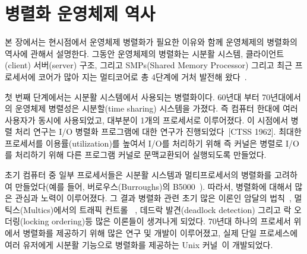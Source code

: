\section{병렬화 운영체제 역사}




본 장에서는 현시점에서 운영체제 병렬화가 필요한 이유와 함께 운영체제의 병렬화의 역사에 관해서 설명한다.
그동안 운영체제의 병렬화는 시분활 시스템, 클라이언트(client) 서버(server) 구조, 그리고 SMPs(Shared Memory
Processor) 그리고 최근 프로세서에 코어가 많아 지는 멀티코어로 총 4단계에 거처 발전해 왔다~\cite{Kaashoek2015PCO}.

첫 번째 단계에서는 시분활 시스템에서 사용되는 병렬화이다. 
60년대 부터 70년대에서의 운영체제 병렬성은 시분할(time sharing) 시스템을 가졌다.
즉 컴퓨터 한대에 여러 사용자가 동시에 사용되었고, 대부분이 1개의 프로세서로 이루어졌다.
이 시점에서 병렬 처리 연구는 I/O 병렬화 프로그램에 대한 연구가 진행되었다~\cite{Bloch1959EDS}[CTSS 1962]. 
최대한 프로세서를 이용률(utilization)를 높여서 I/O를 처리하기 위해 즉 커널은
 병렬로 I/O를 처리하기 위해 다른 프로그램 커널로 문맥교환되어 실행되도록 만들었다.
 

초기 컴퓨터 중 일부 프로세서들은 시분활 시스템과 멀티프로세서의 병렬화를 고려하여
 만들었다(예를 들어, 버로우스(Burroughs)의 B5000~\cite{Mayer1982ABB}).
따라서, 병렬화에 대해서 많은 관심과 노력이 이루어졌다.
그 결과 병렬화 관련 초기 많은 이론인 암달의 법칙~\cite{Amdahl1967VSP}, 멀틱스(Multics)에서의 트래픽 컨트롤
~\cite{Saltzer1966TCM}, 데드락 발견(deadlock detection) 그리고 락 오더링(locking ordering)등
많은 이론들이 생겨나게 되었다. 
70년대 하나의 프로세서 위에서 병렬화를 제공하기 위해 많은 연구 및 개발이 이루어졌고, 실제 
단일 프로세스에 여러 유저에게 시분활 기능으로
 병렬화를 제공하는 Unix 커널~\cite{Ritchie1973UTS}이 개발되었다.

